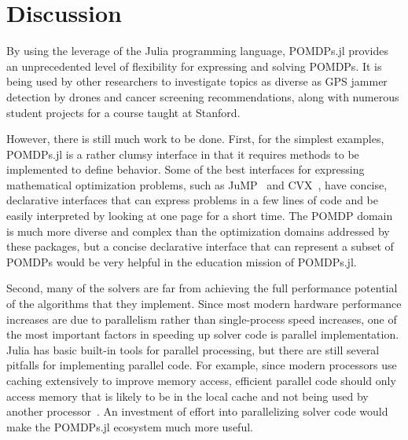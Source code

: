 \section{Discussion}

By using the leverage of the Julia programming language, POMDPs.jl provides an unprecedented level of flexibility for expressing and solving POMDPs. It is being used by other researchers to investigate topics as diverse as GPS jammer detection by drones and cancer screening recommendations, along with numerous student projects for a course taught at Stanford.

However, there is still much work to be done.
First, for the simplest examples, POMDPs.jl is a rather clumsy interface in that it requires methods to be implemented to define behavior.
Some of the best interfaces for expressing mathematical optimization problems, such as JuMP~\cite{dunning2017jump} and CVX~\cite{grant2014cvx}, have concise, declarative interfaces that can express problems in a few lines of code and be easily interpreted by looking at one page for a short time.
The POMDP domain is much more diverse and complex than the optimization domains addressed by these packages, but a concise declarative interface that can represent a subset of POMDPs would be very helpful in the education mission of POMDPs.jl.

Second, many of the solvers are far from achieving the full performance potential of the algorithms that they implement.
Since most modern hardware performance increases are due to parallelism rather than single-process speed increases, one of the most important factors in speeding up solver code is parallel implementation.
Julia has basic built-in tools for parallel processing, but there are still several pitfalls for implementing parallel code.
For example, since modern processors use caching extensively to improve memory access, efficient parallel code should only access memory that is likely to be in the local cache and not being used by another processor~\cite{drepper2007every}.
An investment of effort into parallelizing solver code would make the POMDPs.jl ecosystem much more useful.
